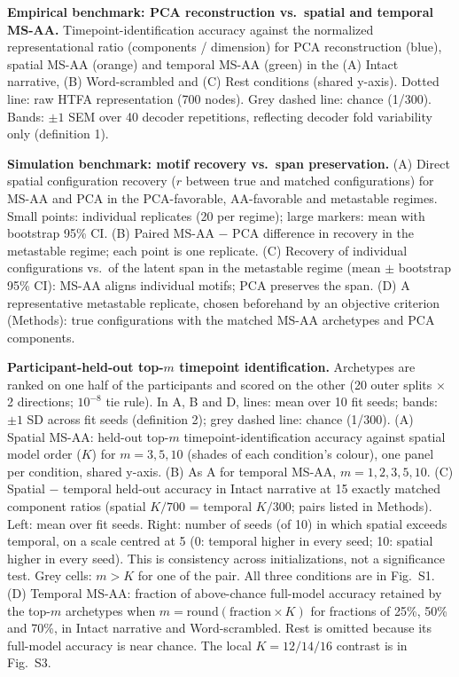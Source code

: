 \caption{\textbf{Empirical benchmark: PCA reconstruction vs.\ spatial and temporal MS-AA.}
Timepoint-identification accuracy against the normalized representational ratio (components / dimension) for PCA reconstruction (blue), spatial MS-AA (orange) and temporal MS-AA (green) in the (A) Intact narrative, (B) Word-scrambled and (C) Rest conditions (shared y-axis). Dotted line: raw HTFA representation (700 nodes). Grey dashed line: chance (1/300). Bands: $\pm 1$ SEM over 40 decoder repetitions, reflecting decoder fold variability only (definition 1).}
\label{fig:benchmark}

\caption{\textbf{Simulation benchmark: motif recovery vs.\ span preservation.}
(A) Direct spatial configuration recovery ($r$ between true and matched configurations) for MS-AA and PCA in the PCA-favorable, AA-favorable and metastable regimes. Small points: individual replicates (20 per regime); large markers: mean with bootstrap 95\% CI. (B) Paired MS-AA $-$ PCA difference in recovery in the metastable regime; each point is one replicate. (C) Recovery of individual configurations vs.\ of the latent span in the metastable regime (mean $\pm$ bootstrap 95\% CI): MS-AA aligns individual motifs; PCA preserves the span. (D) A representative metastable replicate, chosen beforehand by an objective criterion (Methods): true configurations with the matched MS-AA archetypes and PCA components.}
\label{fig:simulation}

\caption{\textbf{Participant-held-out top-$m$ timepoint identification.}
Archetypes are ranked on one half of the participants and scored on the other (20 outer splits $\times$ 2 directions; $10^{-8}$ tie rule). In A, B and D, lines: mean over 10 fit seeds; bands: $\pm 1$ SD across fit seeds (definition 2); grey dashed line: chance (1/300). (A) Spatial MS-AA: held-out top-$m$ timepoint-identification accuracy against spatial model order ($K$) for $m = 3, 5, 10$ (shades of each condition's colour), one panel per condition, shared y-axis. (B) As A for temporal MS-AA, $m = 1, 2, 3, 5, 10$. (C) Spatial $-$ temporal held-out accuracy in Intact narrative at 15 exactly matched component ratios (spatial $K/700$ = temporal $K/300$; pairs listed in Methods). Left: mean over fit seeds. Right: number of seeds (of 10) in which spatial exceeds temporal, on a scale centred at 5 (0: temporal higher in every seed; 10: spatial higher in every seed). This is consistency across initializations, not a significance test. Grey cells: $m > K$ for one of the pair. All three conditions are in Fig.~S1. (D) Temporal MS-AA: fraction of above-chance full-model accuracy retained by the top-$m$ archetypes when $m = \mathrm{round}(\text{fraction} \times K)$ for fractions of 25\%, 50\% and 70\%, in Intact narrative and Word-scrambled. Rest is omitted because its full-model accuracy is near chance. The local $K = 12/14/16$ contrast is in Fig.~S3.}
\label{fig:heldout}

